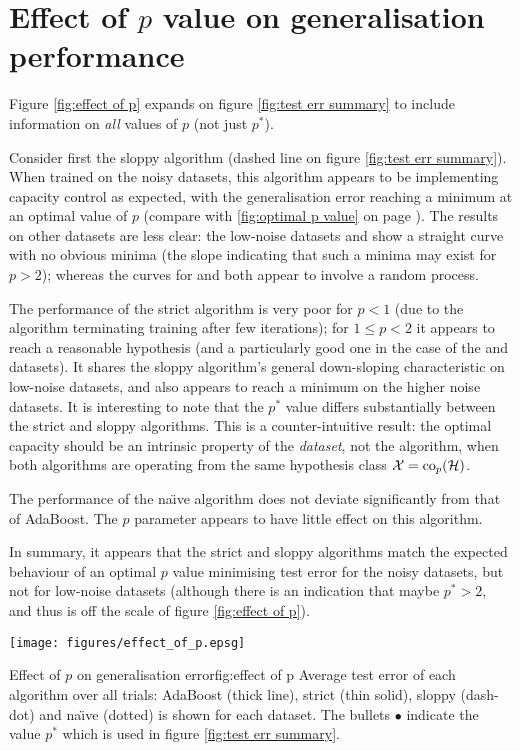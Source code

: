 \section{Effect of $p$ value on generalisation performance}

Figure \ref{fig:effect of p} expands on figure \ref{fig:test err
summary} to include information on \emph{all} values of $p$ (not just
$p^{\ast}$).

Consider first the sloppy algorithm (dashed line on figure
\ref{fig:test err summary}).  When trained on the noisy 
datasets, this algorithm appears to be implementing capacity control
as expected, with the generalisation error reaching a minimum at an
optimal value of $p$ (compare with \ref{fig:optimal p value} on page
\pageref{fig:optimal p value}).  The results on other datasets are
less clear: the low-noise datasets  and  show a
straight curve with no obvious minima (the slope indicating that such
a minima may exist for $p > 2$); whereas the curves for  and
 both appear to involve a random process.

The performance of the strict algorithm is very poor for $p < 1$ (due
to the algorithm terminating training after few iterations); for $1
\leq p < 2$ it appears to reach a reasonable hypothesis (and a
particularly good one in the case of the  and 
datasets).  It shares the sloppy algorithm's general down-sloping
characteristic on low-noise datasets, and also appears to reach a
minimum on the higher noise datasets.  It is interesting to note that
the $p^{\ast}$ value differs substantially between the strict and
sloppy algorithms.  This is a counter-intuitive result: the optimal
capacity should be an intrinsic property of the \emph{dataset}, not
the algorithm, when both algorithms are operating from the same
hypothesis class $\mathcal{X} = \mathrm{co}_p(\mathcal{H})$.

The performance of the na\"{\i}ve algorithm does not deviate
significantly from that of AdaBoost.  The $p$ parameter appears to
have little effect on this algorithm.

In summary, it appears that the strict and sloppy algorithms match the
expected behaviour of an optimal $p$ value minimising test error for
the noisy datasets, but not for low-noise datasets (although there is
an indication that maybe $p^{\ast} > 2$, and thus is off the scale of
figure \ref{fig:effect of p}).

\begin{linefigure}
\begin{center}
\hspace*{-1cm}\texttt{[image: figures/effect\_of\_p.epsg]}
\end{center}
\begin{capt}{Effect of $p$ on generalisation error}{fig:effect of p}
Average test error of each algorithm over all trials: AdaBoost (thick
line), strict (thin solid), sloppy (dash-dot) and na\"{\i}ve (dotted)
is shown for each dataset.  The bullets $\bullet$ indicate the value
$p^{\ast}$ which is used in figure \ref{fig:test err summary}.
\end{capt}
\end{linefigure}

